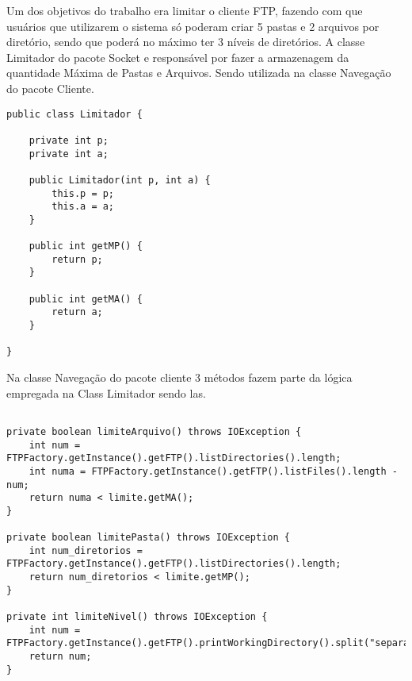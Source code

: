 \documentclass[12pt]{article}
\begin{document}
Um dos objetivos do trabalho era limitar o cliente FTP, fazendo com que usuários que utilizarem o sistema só poderam criar 5 pastas e 2 arquivos por diretório, sendo que poderá no máximo ter 3 níveis de diretórios.
A classe Limitador do pacote Socket e responsável por fazer a armazenagem da quantidade Máxima de Pastas e Arquivos. Sendo utilizada na classe Navegação do pacote Cliente.
 
 \begin{lstlisting}
public class Limitador {

	private int p;
	private int a;
	
	public Limitador(int p, int a) {
		this.p = p;
		this.a = a;
	}
	
	public int getMP() {
		return p;
	}
	
	public int getMA() {
		return a;
	}

}
 \end{lstlisting}

Na classe Navegação do pacote cliente 3 métodos fazem parte da lógica empregada na Class Limitador sendo las.

\begin{lstlisting}

private boolean limiteArquivo() throws IOException {
	int num = FTPFactory.getInstance().getFTP().listDirectories().length;
	int numa = FTPFactory.getInstance().getFTP().listFiles().length - num;
	return numa < limite.getMA();
}

private boolean limitePasta() throws IOException {
	int num_diretorios = FTPFactory.getInstance().getFTP().listDirectories().length;
	return num_diretorios < limite.getMP();
}

private int limiteNivel() throws IOException {
	int num = FTPFactory.getInstance().getFTP().printWorkingDirectory().split("separador").length;
	return num;
}
\end{lstlisting}
\end{document}
